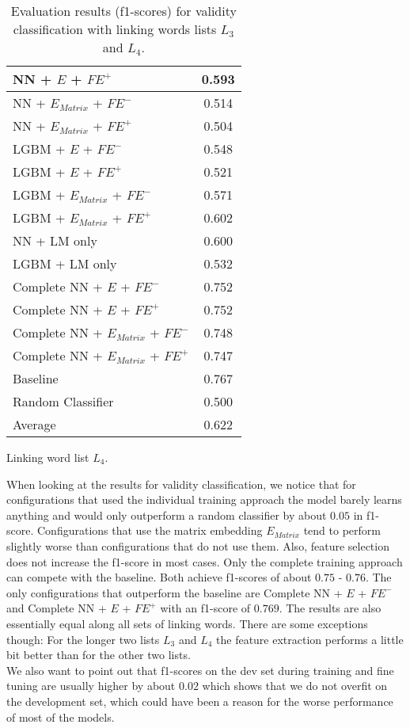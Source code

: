 \begin{table}[h]
\begin{subtable}{.5\textwidth}
\begin{tabular}{|| l || c ||}
 			NN + $E$ + $\textit{FE}^+$ & 0.593 \\
 			\hline
 			NN + $E_{Matrix}$ + $\textit{FE}^-$ & 0.514 \\
 			\hline
 			NN + $E_{Matrix}$ + $\textit{FE}^+$ & 0.504 \\
 			\hline
 			LGBM + $E$ + $\textit{FE}^-$ & 0.548 \\
 			\hline
 			LGBM + $E$ + $\textit{FE}^+$ & 0.521 \\
 			\hline
 			LGBM + $E_{Matrix}$ + $\textit{FE}^-$ & 0.571 \\
 			\hline
 			LGBM + $E_{Matrix}$ + $\textit{FE}^+$ & 0.602 \\
 			\hline
 			NN + LM only & 0.600 \\
 			\hline
 			LGBM + LM only & 0.532 \\
 			\hline
 			Complete NN + $E$ + $\textit{FE}^-$ & 0.752 \\
 			\hline
 			Complete NN + $E$ + $\textit{FE}^+$ & 0.752 \\
 			\hline
 			Complete NN + $E_{Matrix}$ + $\textit{FE}^-$ & 0.748 \\
 			\hline
 			Complete NN + $E_{Matrix}$ + $\textit{FE}^+$ & 0.747 \\
 			\hline
 			Baseline & 0.767 \\
 			\hline
 			Random Classifier & 0.500 \\
 			\hline
 			\hline
 			Average & 0.622 \\
 			\hline
		\end{tabular}
		\renewcommand{\arraystretch}{1}
  		\caption{Linking word list $L_4$.}%
  	\end{subtable}
  	\caption{Evaluation results (f1-scores) for validity classification with linking words lists $L_3$ and $L_4$.}%
  	\label{fig:validityresults2}
\end{table}

\newpage

When looking at the results for validity classification, we notice that for configurations that used the individual training approach the model barely learns anything and would only outperform a random classifier by about $0.05$ in f1-score. Configurations that use the matrix embedding $E_{Matrix}$ tend to perform slightly worse than configurations that do not use them. Also, feature selection does not increase the f1-score in most cases. Only the complete training approach can compete with the baseline. Both achieve f1-scores of about $0.75$ - $0.76$. The only configurations that outperform the baseline are 
Complete NN + $E$ + $\textit{FE}^-$ and Complete NN + $E$ + $\textit{FE}^+$ with an f1-score of $0.769$. The results are also essentially equal along all sets of linking words. There are some exceptions though: For the longer two lists $L_3$ and $L_4$ the feature extraction performs a little bit better than for the other two lists. \\
We also want to point out that f1-scores on the dev set during training and fine tuning are usually higher by about $0.02$ which shows that we do not overfit on the development set, which could have been a reason for the worse performance of most of the models.

